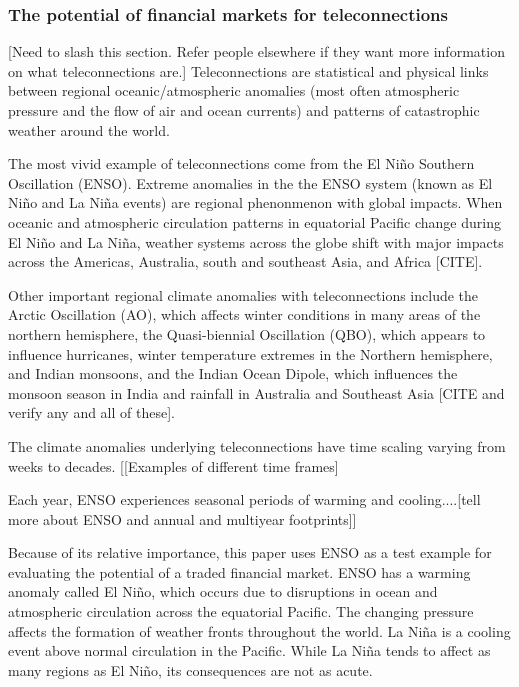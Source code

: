 \documentclass[authoryear]{article}
\begin{document}

\subsubsection{The potential of financial markets for teleconnections}
[Need to slash this section. Refer people elsewhere if they want more information on what teleconnections are.]
Teleconnections are statistical and physical links between regional oceanic/atmospheric anomalies (most often atmospheric pressure and the flow of air and ocean currents) and patterns of catastrophic weather around the world.

The most vivid example of teleconnections come from the El Ni\~no Southern Oscillation (ENSO). Extreme anomalies in the the ENSO system (known as El Ni\~no and La Ni\~na events) are regional phenonmenon with global impacts. When oceanic and atmospheric circulation patterns in equatorial Pacific change during El Ni\~no and La Ni\~na, weather systems across the globe shift with major impacts across the Americas, Australia, south and southeast Asia, and Africa [CITE].

Other important regional climate anomalies with teleconnections include the Arctic Oscillation (AO), which affects winter conditions in many areas of the northern hemisphere, the Quasi-biennial Oscillation (QBO), which appears to influence hurricanes, winter temperature extremes in the Northern hemisphere, and Indian monsoons, and the Indian Ocean Dipole, which influences the monsoon season in India and rainfall in Australia and Southeast Asia [CITE and verify any and all of these].

The climate anomalies underlying teleconnections have time scaling varying from weeks to decades. [[Examples of different time frames]

Each year, ENSO experiences seasonal periods of warming and cooling....[tell more about ENSO and annual and multiyear footprints]]

Because of its relative importance, this paper uses ENSO as a test example for evaluating the potential of a traded financial market. ENSO has a warming anomaly called El Ni\~no, which occurs due to disruptions in ocean and atmospheric circulation across the equatorial Pacific. The changing pressure affects the formation of weather fronts throughout the world. La Ni\~na is a cooling event above normal circulation in the Pacific. While La Ni\~na tends to affect as many regions as El Ni\~no, its consequences are not as acute.
\end{document}

